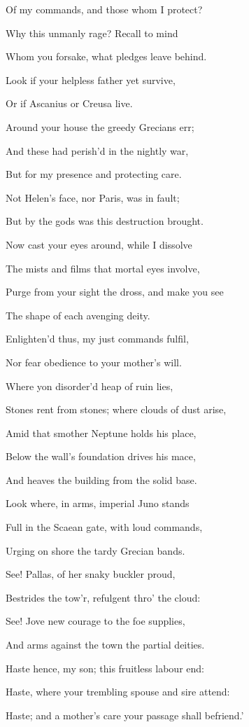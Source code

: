 Of my commands, and those whom I protect?

Why this unmanly rage? Recall to mind

Whom you forsake, what pledges leave behind.

Look if your helpless father yet survive,

Or if Ascanius or Creusa live.

Around your house the greedy Grecians err;

And these had perish’d in the nightly war,

But for my presence and protecting care.

Not Helen’s face, nor Paris, was in fault;

But by the gods was this destruction brought.

Now cast your eyes around, while I dissolve

The mists and films that mortal eyes involve,

Purge from your sight the dross, and make you see

The shape of each avenging deity.

Enlighten’d thus, my just commands fulfil,

Nor fear obedience to your mother’s will.

Where yon disorder’d heap of ruin lies,

Stones rent from stones; where clouds of dust arise,

Amid that smother Neptune holds his place,

Below the wall’s foundation drives his mace,

And heaves the building from the solid base.

Look where, in arms, imperial Juno stands

Full in the Scaean gate, with loud commands,

Urging on shore the tardy Grecian bands.

See! Pallas, of her snaky buckler proud,

Bestrides the tow’r, refulgent thro’ the cloud:

See! Jove new courage to the foe supplies,

And arms against the town the partial deities.

Haste hence, my son; this fruitless labour end:

Haste, where your trembling spouse and sire attend:

Haste; and a mother’s care your passage shall befriend.’

